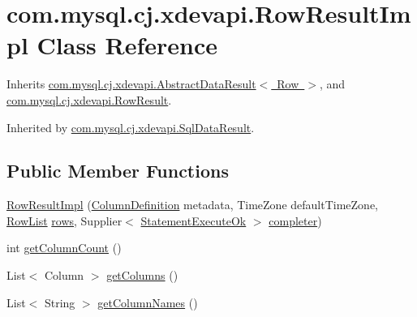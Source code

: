 \hypertarget{classcom_1_1mysql_1_1cj_1_1xdevapi_1_1_row_result_impl}{}\section{com.\+mysql.\+cj.\+xdevapi.\+Row\+Result\+Impl Class Reference}
\label{classcom_1_1mysql_1_1cj_1_1xdevapi_1_1_row_result_impl}


Inherits \mbox{\hyperlink{classcom_1_1mysql_1_1cj_1_1xdevapi_1_1_abstract_data_result}{com.\+mysql.\+cj.\+xdevapi.\+Abstract\+Data\+Result$<$ Row $>$}}, and \mbox{\hyperlink{interfacecom_1_1mysql_1_1cj_1_1xdevapi_1_1_row_result}{com.\+mysql.\+cj.\+xdevapi.\+Row\+Result}}.



Inherited by \mbox{\hyperlink{classcom_1_1mysql_1_1cj_1_1xdevapi_1_1_sql_data_result}{com.\+mysql.\+cj.\+xdevapi.\+Sql\+Data\+Result}}.

\subsection*{Public Member Functions}
\begin{DoxyCompactItemize}
\item 
\mbox{\hyperlink{classcom_1_1mysql_1_1cj_1_1xdevapi_1_1_row_result_impl_aa72492fb1dea056a707df03ddd2d45d8}{Row\+Result\+Impl}} (\mbox{\hyperlink{interfacecom_1_1mysql_1_1cj_1_1protocol_1_1_column_definition}{Column\+Definition}} metadata, Time\+Zone default\+Time\+Zone, \mbox{\hyperlink{interfacecom_1_1mysql_1_1cj_1_1result_1_1_row_list}{Row\+List}} \mbox{\hyperlink{classcom_1_1mysql_1_1cj_1_1xdevapi_1_1_abstract_data_result_ae04b2bf0af10423f89abe996549946f9}{rows}}, Supplier$<$ \mbox{\hyperlink{classcom_1_1mysql_1_1cj_1_1protocol_1_1x_1_1_statement_execute_ok}{Statement\+Execute\+Ok}} $>$ \mbox{\hyperlink{classcom_1_1mysql_1_1cj_1_1xdevapi_1_1_abstract_data_result_aec36caa2d5404a5748add97ebab8bc1e}{completer}})
\item 
int \mbox{\hyperlink{classcom_1_1mysql_1_1cj_1_1xdevapi_1_1_row_result_impl_a0daf18aecc605cbeadee206dc119906f}{get\+Column\+Count}} ()
\item 
List$<$ Column $>$ \mbox{\hyperlink{classcom_1_1mysql_1_1cj_1_1xdevapi_1_1_row_result_impl_a080528edc647e5ab131333d69042b167}{get\+Columns}} ()
\item 
List$<$ String $>$ \mbox{\hyperlink{classcom_1_1mysql_1_1cj_1_1xdevapi_1_1_row_result_impl_a64fc6e525116d24a678c4538f4f072ae}{get\+Column\+Names}} ()
\end{DoxyCompactItemize}
